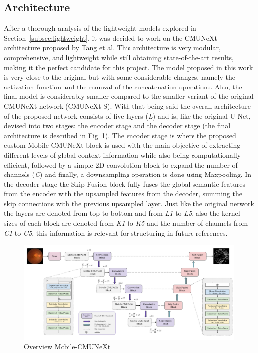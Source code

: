 \documentclass[lettersize,journal]{IEEEtran}
\begin{document}
\subsection{Architecture}
After a thorough analysis of the lightweight models explored in Section~\ref{subsec:lightweight}, it was decided to work on the CMUNeXt architecture proposed by Tang et al. This architecture is very modular, comprehensive, and lightweight while still obtaining state-of-the-art results, making it the perfect candidate for this project. The model proposed in this work is very close to the original but with some considerable changes, namely the activation function and the removal of the concatenation operations. Also, the final model is considerably smaller compared to the smaller variant of the original CMUNeXt network (CMUNeXt-S). With that being said the overall architecture of the proposed network consists of five layers (\textit{L}) and is, like the original U-Net, devised into two stages: the encoder stage and the decoder stage (the final architecture is described in Fig~\ref{fig:mobilecmunext-arch}). The encoder stage is where the proposed custom Mobile-CMUNeXt block is used with the main objective of extracting different levels of global context information while also being computationally efficient, followed by a simple 2D convolution block to expand the number of channels (\textit{C}) and finally, a downsampling operation is done using Maxpooling. In the decoder stage the Skip Fusion block fully fuses the global semantic features from the encoder with the upsampled features from the decoder, summing the skip connections with the previous upsampled layer. Just like the original network the layers are denoted from top to bottom and from \textit{L1} to \textit{L5}, also the kernel sizes of each block are denoted from \textit{K1} to \textit{K5} and the number of channels from \textit{C1} to \textit{C5}, this information is relevant for structuring in future references.

\begin{figure}
    \centering
    \includegraphics[width=\textwidth]{figures/Network Architecture.pdf}
    \caption{Overview Mobile-CMUNeXt}
    \label{fig:mobilecmunext-arch}
\end{figure}
\end{document}
